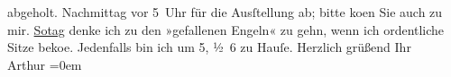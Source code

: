 \begin{ledgroupsized}[t]{13cm}
{{{                  abgeholt.}}}\label{K_L00126_1h}{ }Nachmittag vor 5 Uhr für die Ausſtellung ab; bitte ko{\geminationm}en
               Sie auch zu mir. \uline{So{\geminationn}tag} denke ich zu den »gefallenen Engeln« zu gehn,
               wenn ich ordentliche Sitze beko{\geminationm}e. Jedenfalls bin ich um
                  5, ½ 6 zu Hauſe.\pend
           \pstart
           Herzlich grüßend Ihr{\\[\baselineskip]}\spacefill\mbox{Arthur}\pend
           \leftskip=0em{}          \endnumbering{}\end{ledgroupsized}  \newcommand{\dateiname}{L00126}\newcommand{\titel}{Arthur Schnitzler an Richard Beer-Hofmann, 2. 10. 1892}\newcommand{\editorInnen}{Martin Anton Müller und Gerd-Hermann Susen}
            \footnotesize
\begin{ledgroupsized}[t]{11.5cm}
\end{ledgroupsized}
         
      